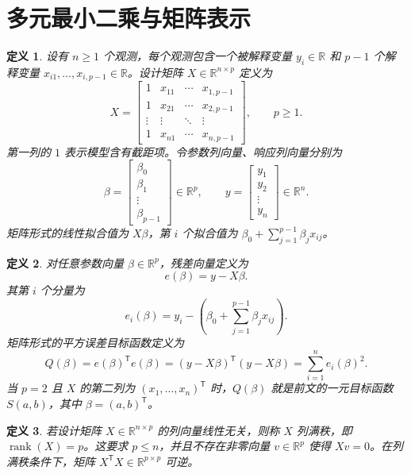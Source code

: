 \documentclass[UTF8,fontset=fandol,11pt]{ctexart}
\newtheorem{definition}{定义}[section]
\begin{document}
\section{多元最小二乘与矩阵表示}\label{sec:S02}
\begin{definition}
\label{def:design-matrix}设有 $n\geq 1$ 个观测，每个观测包含一个被解释变量 $y_i\in\mathbb{R}$ 和 $p-1$ 个解释变量 $x_{i1},\ldots,x_{i,p-1}\in\mathbb{R}$。设计矩阵 $X\in\mathbb{R}^{n\times p}$ 定义为
\[
X=\begin{bmatrix}
1&x_{11}&\cdots&x_{1,p-1}\\
1&x_{21}&\cdots&x_{2,p-1}\\
\vdots&\vdots&\ddots&\vdots\\
1&x_{n1}&\cdots&x_{n,p-1}
\end{bmatrix},
\qquad p\geq 1.
\]
第一列的 $1$ 表示模型含有截距项。令参数列向量、响应列向量分别为
\[
\beta=\begin{bmatrix}\beta_0\\\beta_1\\\vdots\\\beta_{p-1}\end{bmatrix}\in\mathbb{R}^{p},
\qquad
y=\begin{bmatrix}y_1\\y_2\\\vdots\\y_n\end{bmatrix}\in\mathbb{R}^{n}.
\]
矩阵形式的线性拟合值为 $X\beta$，第 $i$ 个拟合值为 $\beta_0+\sum_{j=1}^{p-1}\beta_jx_{ij}$。
\end{definition}
\begin{definition}
对任意参数向量 $\beta\in\mathbb{R}^{p}$，残差向量定义为
\begin{equation}
e(\beta)=y-X\beta.
\label{def:residual-vector}
\end{equation}
其第 $i$ 个分量为
\[
e_i(\beta)=y_i-\left(\beta_0+\sum_{j=1}^{p-1}\beta_jx_{ij}\right).
\]
矩阵形式的平方误差目标函数定义为
\[
Q(\beta)=e(\beta)^{\mathsf T}e(\beta)=(y-X\beta)^{\mathsf T}(y-X\beta)=\sum_{i=1}^{n}e_i(\beta)^2.
\]
当 $p=2$ 且 $X$ 的第二列为 $(x_1,\ldots,x_n)^{\mathsf T}$ 时，$Q(\beta)$ 就是前文的一元目标函数 $S(a,b)$，其中 $\beta=(a,b)^{\mathsf T}$。
\end{definition}
\begin{definition}
若设计矩阵 $X\in\mathbb{R}^{n\times p}$ 的列向量线性无关，则称 $X$ 列满秩，即 $\operatorname{rank}(X)=p$。这要求 $p\leq n$，并且不存在非零向量 $v\in\mathbb{R}^{p}$ 使得 $Xv=0$。在列满秩条件下，矩阵 $X^{\mathsf T}X\in\mathbb{R}^{p\times p}$ 可逆。
\end{definition}
\end{document}
